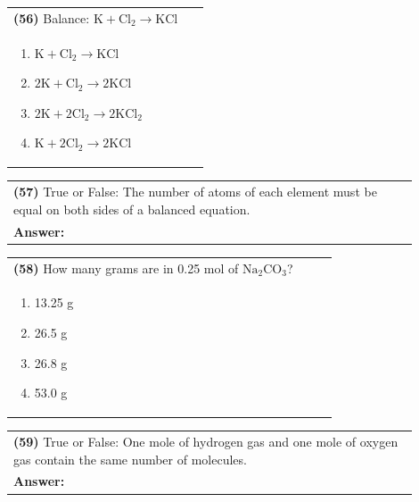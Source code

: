 \documentclass{article}
\begin{document}
{\vspace{0.2cm}
\noindent \begin{tabular}{|p{0.9\linewidth}|}
\hline
\vspace{0.2cm}
\textbf{(56)} Balance: $\mathrm{K + Cl_2 \rightarrow KCl}$\\
\begin{minipage}[t]{0.85\linewidth}
\begin{enumerate}[label=\alph*.]
\item $\mathrm{K + Cl_2 \rightarrow KCl}$
\item $\mathrm{2K + Cl_2 \rightarrow 2KCl}$
\item $\mathrm{2K + 2Cl_2 \rightarrow 2KCl_2}$
\item $\mathrm{K + 2Cl_2 \rightarrow 2KCl}$
\end{enumerate}
\end{minipage}\\
\hline
\end{tabular}
\newpage

\vspace{0.2cm}
\noindent \begin{tabular}{|p{0.9\linewidth}|}
\hline
\vspace{0.2cm}
\textbf{(57)} True or False: The number of atoms of each element must be equal on both sides of a balanced equation.\\
\textbf{Answer:} \underline{\hspace{2cm}}\\
\hline
\end{tabular}

\vspace{0.2cm}
\noindent \begin{tabular}{|p{0.9\linewidth}|}
\hline
\vspace{0.2cm}
\textbf{(58)} How many grams are in 0.25 mol of $\mathrm{Na_2CO_3}$?\\
\begin{minipage}[t]{0.85\linewidth}
\begin{enumerate}[label=\alph*.]
\item 13.25 g
\item 26.5 g
\item 26.8 g
\item 53.0 g
\end{enumerate}
\end{minipage}\\
\hline
\end{tabular}

\vspace{0.2cm}
\noindent \begin{tabular}{|p{0.9\linewidth}|}
\hline
\vspace{0.2cm}
\textbf{(59)} True or False: One mole of hydrogen gas and one mole of oxygen gas contain the same number of molecules.\\
\textbf{Answer:} \underline{\hspace{2cm}}\\
\hline
\end{tabular}

}
\end{document}
